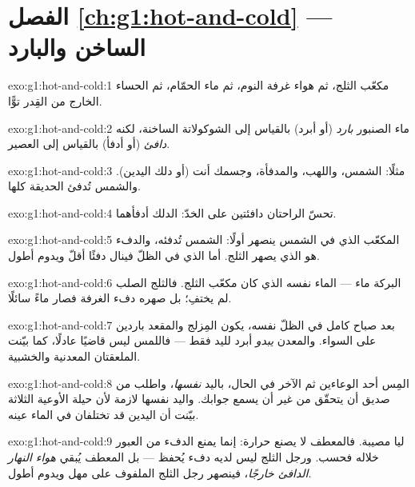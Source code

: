 \section*{الفصل \ref{ch:g1:hot-and-cold} --- الساخن والبارد}

\begin{solution}{exo:g1:hot-and-cold:1}
مكعّب الثلج، ثم هواء غرفة النوم، ثم ماء الحمّام، ثم الحساء
الخارج من القِدر توًّا.
\end{solution}

\begin{solution}{exo:g1:hot-and-cold:2}
ماء الصنبور \emph{بارد} (أو أبرد) بالقياس إلى الشوكولاتة
الساخنة، لكنه \emph{دافئ} (أو أدفأ) بالقياس إلى العصير.
\end{solution}

\begin{solution}{exo:g1:hot-and-cold:3}
مثلًا: الشمس، واللهب، والمدفأة، وجسمك أنت (أو دلك اليدين).
والشمس تُدفئ الحديقة كلها.
\end{solution}

\begin{solution}{exo:g1:hot-and-cold:4}
تحسّ الراحتان دافئتين على الخدّ: الدلك أدفأهما.
\end{solution}

\begin{solution}{exo:g1:hot-and-cold:5}
المكعّب الذي في الشمس ينصهر أولًا: الشمس تُدفئه، والدفء هو الذي
يصهر الثلج. أما الذي في الظلّ فينال دفئًا أقلّ ويدوم أطول.
\end{solution}

\begin{solution}{exo:g1:hot-and-cold:6}
البركة ماء --- الماء نفسه الذي كان مكعّب الثلج. فالثلج الصلب لم
يختفِ؛ بل صهره دفء الغرفة فصار ماءً سائلًا.
\end{solution}

\begin{solution}{exo:g1:hot-and-cold:7}
بعد صباح كامل في الظلّ نفسه، يكون المِزلج والمقعد باردين على
السواء. والمعدن \emph{يبدو} أبرد لليد فقط --- فاللمس ليس قاضيًا
عادلًا، كما بيّنت الملعقتان المعدنية والخشبية.
\end{solution}

\begin{solution}{exo:g1:hot-and-cold:8}
المِس أحد الوعاءين ثم الآخر في الحال، باليد \emph{نفسها}، واطلب
من صديق أن يتحقّق من غير أن يسمع جوابك. واليد نفسها لازمة
لأن حيلة الأوعية الثلاثة بيّنت أن اليدين قد تختلفان في الماء
عينه.
\end{solution}

\begin{solution}{exo:g1:hot-and-cold:9}
ليا مصيبة. فالمعطف لا يصنع حرارة: إنما يمنع الدفء من العبور
خلاله فحسب. ورجل الثلج ليس لديه دفء يُحفظ --- بل المعطف يُبقي
\emph{هواء النهار الدافئ خارجًا}، فينصهر رجل الثلج الملفوف على
مهل ويدوم أطول.
\end{solution}
